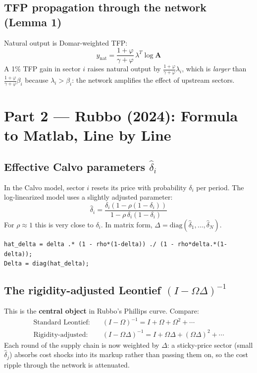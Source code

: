 \documentclass[11pt]{article}
\begin{document}
\subsection{TFP propagation through the network (Lemma 1)}

Natural output is Domar-weighted TFP:
\[
  y_{\text{nat}} = \frac{1+\varphi}{\gamma+\varphi}\,\lambda^T \log \mathbf{A}
\]
A 1\% TFP gain in sector $i$ raises natural output by
$\frac{1+\varphi}{\gamma+\varphi}\lambda_i$, which is \emph{larger} than
$\frac{1+\varphi}{\gamma+\varphi}\beta_i$ because $\lambda_i > \beta_i$:
the network amplifies the effect of upstream sectors.

\section{Part 2 — Rubbo (2024): Formula to Matlab, Line by Line}

\subsection{Effective Calvo parameters $\hat\delta_i$}

In the Calvo model, sector $i$ resets its price with probability $\delta_i$ per
period. The log-linearized model uses a slightly adjusted parameter:
\[
  \hat\delta_i = \frac{\delta_i(1-\rho(1-\delta_i))}{1-\rho\,\delta_i(1-\delta_i)}
\]
For $\rho \approx 1$ this is very close to $\delta_i$. In matrix form,
$\Delta = \mathrm{diag}(\hat\delta_1,\ldots,\hat\delta_N)$.

\begin{lstlisting}[caption={Matlab: effective Calvo parameters}]
hat_delta = delta .* (1 - rho*(1-delta)) ./ (1 - rho*delta.*(1-delta));
Delta = diag(hat_delta);
\end{lstlisting}

\subsection{The rigidity-adjusted Leontief $(I-\Omega\Delta)^{-1}$}

This is the \textbf{central object} in Rubbo's Phillips curve. Compare:
\begin{align*}
  \text{Standard Leontief:}\quad &(I-\Omega)^{-1} = I + \Omega + \Omega^2 + \cdots\\
  \text{Rigidity-adjusted:}\quad &(I-\Omega\Delta)^{-1} = I + \Omega\Delta + (\Omega\Delta)^2 + \cdots
\end{align*}
Each round of the supply chain is now weighted by $\Delta$: a sticky-price sector
(small $\hat\delta_j$) absorbs cost shocks into its markup rather than passing them on,
so the cost ripple through the network is attenuated.
\end{document}
